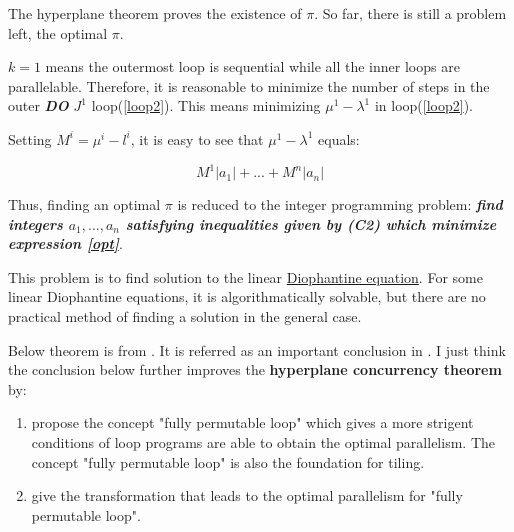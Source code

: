 
The hyperplane theorem proves the existence of $\pi$. So far, there is still
a problem left, the optimal $\pi$.

$k=1$ means the outermost loop is sequential while all the inner loops are parallelable.
Therefore, it is reasonable to minimize the number of steps in the outer \textit{\textbf{DO}}
$J^1$ loop(\ref{loop2}). This means minimizing $\mu^1 - \lambda^1$ in loop(\ref{loop2}).

Setting $M^i = \mu^i - l^i$, it is easy to see that $\mu^1 - \lambda^1$ equals:

\begin{equation} \label{opt}
M^1|a_1|+...+M^n|a_n|
\end{equation}

Thus, finding an optimal $\pi$ is reduced to the integer programming problem:
\textit{\textbf{find integers $a_1,...,a_n$ satisfying inequalities given by (C2)
which minimize expression \ref{opt}}}.

This problem is to find solution to the linear
{\href{https://books.google.co.jp/books?hl=zh-CN&lr=&id=QugvF7xfE-oC&oi=fnd&pg=PP1&dq=mordell+diophantine+equations&ots=KQngn0xTIB&sig=TRaDlam9XGLmO5l-PuFtZE8X0xw#v=onepage&q&f=false}{Diophantine equation}}\cite{Diophantinewiki,mordell1969diophantine}.
For some linear Diophantine equations, it is algorithmatically solvable, but there
are no practical method of finding a solution in the general case.

\begin {info}
Below theorem is from \cite{irigoin1988supernode}. It is referred as an important
conclusion in \cite{wolf1991loop}. I just think
the conclusion below further improves the \textbf{hyperplane concurrency theorem} by:

\begin{enumerate}
  \item propose the concept "fully permutable loop" which gives a more strigent
  conditions of loop programs are able to obtain the optimal parallelism. The
  concept "fully permutable loop" is also the foundation for tiling.
  \item give the transformation that leads to the optimal parallelism for "fully
  permutable loop".
\end{enumerate}

\end {info}
